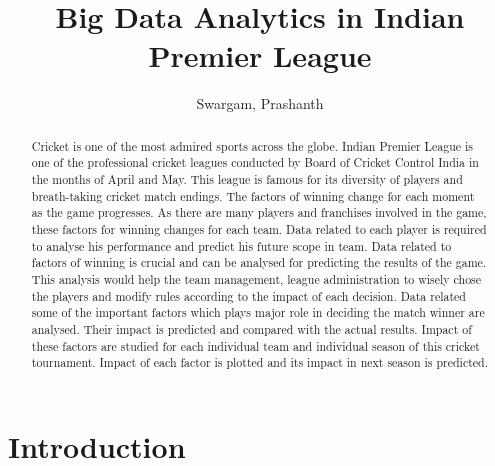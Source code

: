 \documentclass[sigconf]{acmart}
\begin{document}
\title{Big Data Analytics in Indian Premier League}


\author{Swargam, Prashanth}



\renewcommand{\shortauthors}{G. v. Laszewski}


\begin{abstract}

Cricket is one of the most admired sports across the globe. Indian Premier League is one of the professional cricket leagues conducted by Board of Cricket Control India in the months of April and May. This league is famous for its diversity of players and breath-taking cricket match endings. The factors of winning change for each moment as the game progresses. As there are many players and franchises involved in the game, these factors for winning changes for each team. Data related to each player is required to analyse his performance and predict his future scope in team. Data related to factors of winning is crucial and can be analysed for predicting the results of the game. This analysis would help the team management, league administration to wisely chose the players and modify rules according to the impact of each decision. Data related some of the important factors which plays major role in deciding the match winner are analysed. Their impact is predicted and compared with the actual results. Impact of these factors are studied for each individual team and individual season of this cricket tournament. Impact of each factor is plotted and its impact in next season is predicted.

\end{abstract}



\maketitle



\section{Introduction}
\end{document}

